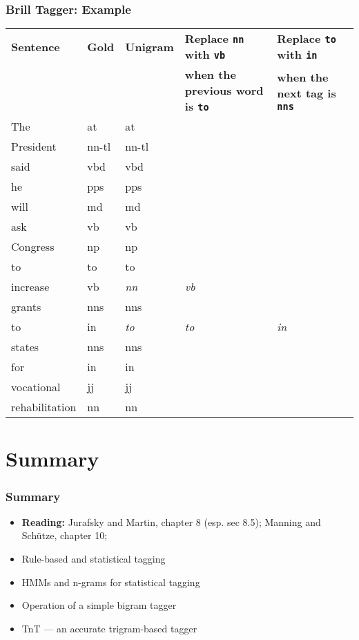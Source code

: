 \documentclass{beamer}
\begin{document}
\begin{frame}
  \frametitle{Brill Tagger: Example}

{\scriptsize
\begin{tabular}{lllp{4cm}p{4cm}}
\textbf{Sentence}
& \textbf{Gold}
& \textbf{Unigram}
& \textbf{Replace \texttt{nn} with \texttt{vb}}
& \textbf{Replace \texttt{to} with \texttt{in}} \\
&&& \textbf{when the previous word is \texttt{to}}
& \textbf{when the next tag is \texttt{nns}} \\ \hline
The            & at      & at \\
President      & nn-tl   & nn-tl \\
said           & vbd     & vbd \\
he             & pps     & pps \\
will           & md      & md \\
ask            & vb      & vb \\
Congress       & np      & np \\
to             & to      & to \\
increase       & vb      & \textit{nn}     &    \textit{vb} \\
grants         & nns     & nns \\
to             & in      & \textit{to}     &    \textit{to} &   \textit{in} \\
states         & nns     & nns \\
for            & in      & in \\
vocational     & jj      & jj \\
rehabilitation & nn      & nn
\end{tabular}
}
\end{frame}


\section{Summary}

\begin{frame}
  \frametitle{Summary}

  \begin{itemize}
  \item \textbf{Reading:} 
    Jurafsky and Martin, chapter 8 (esp. sec 8.5); 
    Manning and Sch\"utze, chapter 10; 
  \item Rule-based and statistical tagging
  \item HMMs and n-grams for statistical tagging
  \item Operation of a simple bigram tagger
  \item TnT --- an accurate trigram-based tagger
  \end{itemize}
\end{frame}
\end{document}
